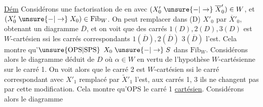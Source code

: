 \uline{Dém} Considérons une factorisation de
en
avec $(X'_0\mathrel{\unsure{-|\to}}\overline X'_0)\in W$, et $(X'_0\mathrel{\unsure{-|\to}}X_0)\in\mathrm{Fib}_W$. On peut  remplacer dans (D) $X'_0$ par $\overline X'_0$,  obtenant un diagramme $\overline D$, et on voit 
que  des carrés $1(D),2(D),3(D)$ est $W$-cartésien ssi les carrés correspondants $1(\overline D),2(\overline D)$\unsure{, --|,} $3(\overline D)$ l'est. Cela montre qu'$\unsure{\mathrm{OPS}|\mathrm{SPS}}$ $X_0\mathrel{\unsure{-|\to}} S$ dans $\mathrm{Fib}_W$. Considérons alors le diagramme  déduit de $D$
où $\alpha\in W$ en vertu de l'hypothèse $W$-cartésienne sur le carré 1. On voit alors que le carré 2 est $W$-cartésien ssi le carré correspondant avec $X'_1$ remplacé par $\widetilde X'_1$ l'est,  aux carrés 1, 3 ils ne changent pas par cette modification. Cela montre qu'$\mathrm{OPS}$ le carré 1 \uline{cartésien}. Considérons alors le diagramme

